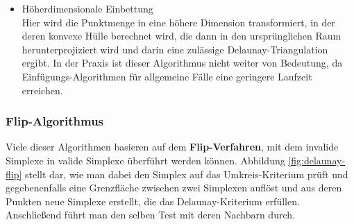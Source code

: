 \begin{itemize}
Cignoni et al.\cite{cignoni_1998} haben eine DeWall genannte\footnote{DeWall steht hier für Delaunay Wall Algorithm, so benannt nach den Wänden, an denen getrennt und wieder verknüpft wird} Methode gefunden, die eine zwar worst-case-Laufzeit von  ergibt, die sich jedoch nur in pathologischen Fällen zeigt.
Nimmt man annähernde Gleichverteilungen an, die im vorliegenden Anwendungsfall gegeben sind, konvergiert dieser Algorithmus in drei Dimensionen subquadratisch und ist somit vergleichbar effizient.
Es zeigt sich allerdings, dass er trotz der vermeintlich langen Laufzeit vor allem bei periodischen und periodisch erweiterten Systemen effizient arbeitet, da hier ohnehin Grenzflächen existieren, an denen Teiltriangulationen auf einander abgestimmt werden müssen.
Andererseits ist das Parsivald-Modell ohnehin für parallele Platformen ausgelegt, so dass hier weitere Leistungssteigerungen zu erwarten sind.
Ebenso eignet sich diese Methode zur Einbettung neu berechneter Würfel in die Struktur, wie es beim Parsivald-Modell nach jeder simulierten Reaktion vorkommt.

\item Höherdimensionale Einbettung\\
Hier wird die Punktmenge in eine höhere Dimension transformiert, in der deren konvexe Hülle berechnet wird, die dann in den ursprünglichen Raum herunterprojiziert wird und darin eine zulässige Delaunay-Triangulation ergibt.
In der Praxis ist dieser Algorithmus nicht weiter von Bedeutung, da Einfügungs-Algorithmen für allgemeine Fälle eine geringere Laufzeit erreichen.

\end{itemize}

\subsubsection{Flip-Algorithmus}

Viele dieser Algorithmen basieren auf dem \textbf{Flip-Verfahren}, mit dem invalide Simplexe in valide Simplexe überführt werden können.
Abbildung \ref{fig:delaunay-flip} stellt dar, wie man dabei den Simplex auf das Umkreis-Kriterium prüft und gegebenenfalls eine Grenzfläche zwischen zwei Simplexen auflöst und aus deren Punkten neue Simplexe erstellt, die das Delaunay-Kriterium erfüllen.
Anschließend führt man den selben Test mit deren Nachbarn durch.

